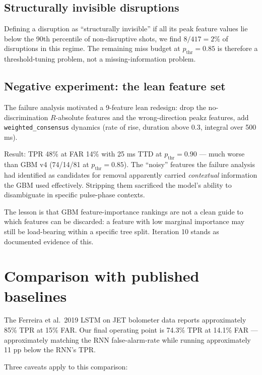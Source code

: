 \documentclass[11pt,letterpaper]{article}
\begin{document}
\subsection{Structurally invisible disruptions}

Defining a disruption as ``structurally invisible'' if all its peak
feature values lie below the 90th percentile of non-disruptive shots,
we find $8 / 417 = 2\%$ of disruptions in this regime. The remaining
miss budget at $p_{\mathrm{thr}} = 0.85$ is therefore a
threshold-tuning problem, not a missing-information problem.

\subsection{Negative experiment: the lean feature set}\label{ssec:lean}

The failure analysis motivated a 9-feature lean redesign: drop the
no-discrimination $R$-absolute features and the wrong-direction peakz
features, add \texttt{weighted\_consensus} dynamics (rate of rise,
duration above 0.3, integral over 500 ms).

Result: TPR 48\% at FAR 14\% with 25 ms TTD at $p_{\mathrm{thr}} = 0.90$
--- much worse than GBM v4 (74/14/81 at $p_{\mathrm{thr}} = 0.85$). The
``noisy'' features the failure analysis had identified as candidates
for removal apparently carried \emph{contextual} information the GBM
used effectively. Stripping them sacrificed the model's ability to
disambiguate in specific pulse-phase contexts.

The lesson is that GBM feature-importance rankings are not a clean
guide to which features can be discarded: a feature with low marginal
importance may still be load-bearing within a specific tree split.
Iteration 10 stands as documented evidence of this.

\section{Comparison with published baselines}\label{sec:baselines}

The Ferreira et al.\ 2019 \cite{ferreira2019} LSTM on JET bolometer
data reports approximately 85\% TPR at 15\% FAR. Our final operating
point is 74.3\% TPR at 14.1\% FAR --- approximately matching the
RNN false-alarm-rate while running approximately 11 pp below the
RNN's TPR.

Three caveats apply to this comparison:
\end{document}
